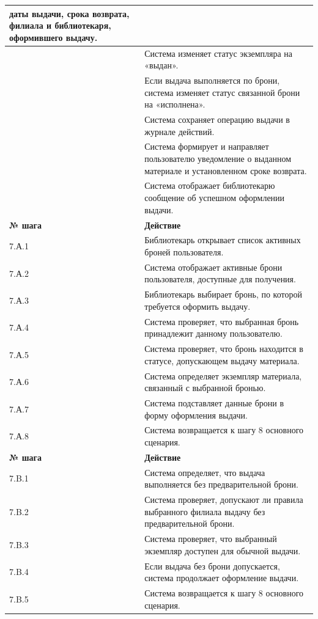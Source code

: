 \documentclass[12pt,a4paper]{article}
\begin{document}
\begin{xltabular}{\textwidth}{
				|>{\raggedright\arraybackslash}p{2.7cm}
				|>{\raggedright\arraybackslash}X|
			}
			даты выдачи, срока возврата, филиала и библиотекаря, оформившего
			выдачу. \\
			 & Система изменяет статус экземпляра на «выдан». \\
			 & Если выдача выполняется по брони, система изменяет статус связанной
			брони на «исполнена». \\
			 & Система сохраняет операцию выдачи в журнале действий. \\
			 & Система формирует и направляет пользователю уведомление о
			выданном материале и установленном сроке возврата. \\
			 & Система отображает библиотекарю сообщение об успешном
			оформлении выдачи. \\
			\hline
			
			
			\textbf{№ шага} & \textbf{Действие} \\
			\hline
			
			7.А.1 & Библиотекарь открывает список активных броней пользователя. \\
			\hline
			7.А.2 & Система отображает активные брони пользователя, доступные для
			получения. \\
			\hline
			7.А.3 & Библиотекарь выбирает бронь, по которой требуется оформить выдачу. \\
			\hline
			7.А.4 & Система проверяет, что выбранная бронь принадлежит данному
			пользователю. \\
			\hline
			7.А.5 & Система проверяет, что бронь находится в статусе, допускающем
			выдачу материала. \\
			\hline
			7.А.6 & Система определяет экземпляр материала, связанный с выбранной
			бронью. \\
			\hline
			7.А.7 & Система подставляет данные брони в форму оформления выдачи. \\
			\hline
			7.А.8 & Система возвращается к шагу 8 основного сценария. \\
			\hline
			
			
			\textbf{№ шага} & \textbf{Действие} \\
			\hline
			
			7.B.1 & Система определяет, что выдача выполняется без предварительной
			брони. \\
			\hline
			7.B.2 & Система проверяет, допускают ли правила выбранного филиала выдачу
			без предварительной брони. \\
			\hline
			7.B.3 & Система проверяет, что выбранный экземпляр доступен для обычной
			выдачи. \\
			\hline
			7.B.4 & Если выдача без брони допускается, система продолжает оформление
			выдачи. \\
			\hline
			7.B.5 & Система возвращается к шагу 8 основного сценария. \\
			\hline
			

\end{xltabular}
\end{document}
